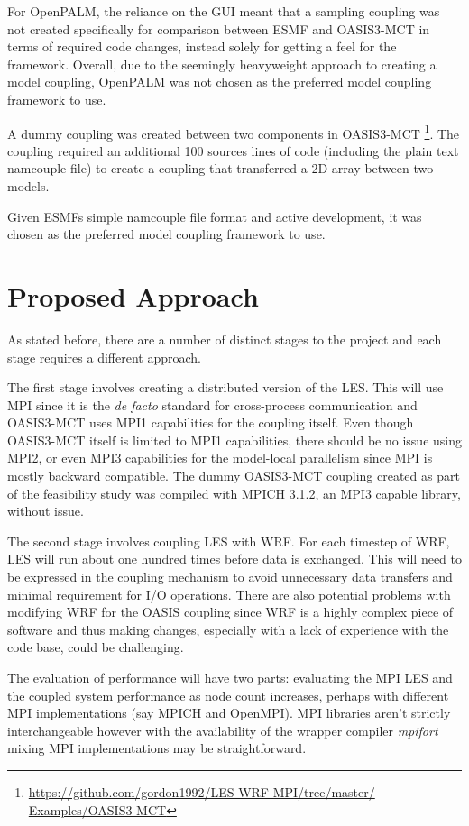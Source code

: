 \documentclass{acm_proc_article-sp}
\begin{document}
For OpenPALM, the reliance on the GUI meant that a sampling coupling was not
created specifically for comparison between ESMF and OASIS3-MCT in terms of
required code changes, instead solely for getting a feel for the framework.
Overall, due to the seemingly heavyweight approach to creating a model coupling,
OpenPALM was not chosen as the preferred model coupling framework to use.

A dummy coupling was created between two components in OASIS3-MCT
\footnote{\url{https://github.com/gordon1992/LES-WRF-MPI/tree/master/
Examples/OASIS3-MCT}}. The coupling required an additional 100 sources lines of
code (including the plain text namcouple file) to create a coupling that
transferred a 2D array between two models.

Given ESMFs simple namcouple file format and active development, it was chosen
as the preferred model coupling framework to use.

\section*{Proposed Approach}

As stated before, there are a number of distinct stages to the project and each
stage requires a different approach.

The first stage involves creating a distributed version of the LES. This will
use MPI since it is the \textit{de facto} standard for cross-process
communication and OASIS3-MCT uses MPI1 capabilities for the coupling itself.
Even though OASIS3-MCT itself is limited to MPI1 capabilities, there should be
no issue using MPI2, or even MPI3 capabilities for the model-local parallelism
since MPI is mostly backward compatible. The dummy OASIS3-MCT coupling created
as part of the feasibility study was compiled with MPICH 3.1.2, an MPI3 capable
library, without issue.

The second stage involves coupling LES with WRF. For each timestep of WRF, LES
will run about one hundred times before data is exchanged. This will need to be
expressed in the coupling mechanism to avoid unnecessary data transfers and
minimal requirement for I/O operations. There are also potential problems with
modifying WRF for the OASIS coupling since WRF is a highly complex piece of
software and thus making changes, especially with a lack of experience with the
code base, could be challenging.

The evaluation of performance will have two parts: evaluating the MPI LES and
the coupled system performance as node count increases, perhaps with different
MPI implementations (say MPICH and OpenMPI). MPI libraries aren't strictly
interchangeable however with the availability of the wrapper compiler
\textit{mpifort} mixing MPI implementations may be straightforward.
\end{document}
